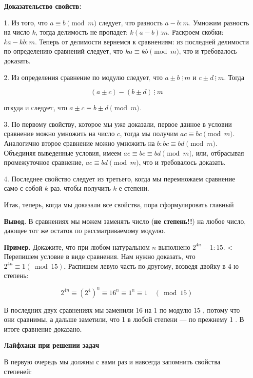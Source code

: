 \textbf{Доказательство свойств:}

1. Из того, что $a \equiv b \pmod{m}$ следует, что разность $a-b: m$. Умножим разность на число $k$, тогда делимость не пропадет: $k(a-b) \vdots m$. Раскроем скобки: $k a-k b: m$. Теперь от делимости вернемся к сравнениям: из последней делимости по определению сравнений следует, что $k a \equiv k b \pmod{m}$, что и требовалось доказать.

2. Из определения сравнение по модулю следует, что $a\pm b \ \vdots \ m$ и $c\pm d\ \vdots \ m$. Тогда

\[
(a\pm c)-(b\pm d) \ \vdots \ m
\]

откуда и следует, что $a \pm c \equiv b \pm d\pmod{m}$.

3. По первому свойству, которое мы уже доказали, первое данное в условии сравнение можно умножить на число $c$, тогда мы получим $a c \equiv b c\pmod{m}$. Аналогично второе сравнение можно умножить на $b: b c \equiv b d\pmod{m}$. Объединяя выведенные условия, имеем $a c \equiv b c \equiv b d\pmod{m}$, или, отбрасывая промежуточное сравнение, $a c \equiv b d\pmod{m}$, что и требовалось доказать.

4. Последнее свойство следует из третьего, когда мы перемножаем сравнение само с собой $k$ раз. чтобы получить $k$-е степени.

Итак, теперь, когда мы доказали все свойства, пора сформулировать главный

\textbf{Вывод.}
В сравнениях мы можем заменять число (\textbf{не степень!!}) на любое число, дающее тот же остаток по рассматриваемому модулю.

\textbf{Пример.} Докажите, что при любом натуральном $n$ выполнено $2^{4 n}-1: 15$.
< Перепишем условие в виде сравнения. Нам нужно доказать, что $2^{4 n} \equiv 1(\bmod 15)$. Распишем левую часть по-другому, возведя двойку в 4-ю степень:

$$
2^{4 n} \equiv\left(2^4\right)^n \equiv 16^n \equiv 1^n \equiv 1 \quad(\bmod 15)
$$


В последних двух сравнениях мы заменили 16 на 1 по модулю 15 , потому что они сравнимы, а дальше заметили, что 1 в любой степени --- по прежнему 1 . В итоге сравнение доказано.

\newpage

\hspace{3mm}


\centerline{\bf \Huge Лайфхаки при решении задач}

В первую очередь мы должны с вами раз и навсегда запомнить свойства степеней:

